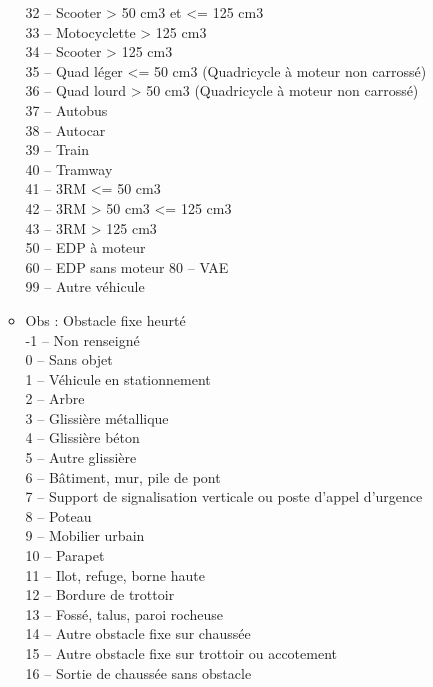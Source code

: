 \documentclass[french,]{tp}
\begin{document}
\begin{itemize}
\begin{itemize}
    32 -- Scooter \textgreater{} 50 cm3 et \textless= 125 cm3\\
    33 -- Motocyclette \textgreater{} 125 cm3\\
    34 -- Scooter \textgreater{} 125 cm3\\
    35 -- Quad léger \textless= 50 cm3 (Quadricycle à moteur non carrossé)\\
    36 -- Quad lourd \textgreater{} 50 cm3 (Quadricycle à moteur non carrossé)\\
    37 -- Autobus\\
    38 -- Autocar\\
    39 -- Train\\
    40 -- Tramway\\
    41 -- 3RM \textless= 50 cm3\\
    42 -- 3RM \textgreater{} 50 cm3 \textless= 125 cm3\\
    43 -- 3RM \textgreater{} 125 cm3\\
    50 -- EDP à moteur\\
    60 -- EDP sans moteur 80 -- VAE\\
    99 -- Autre véhicule
  \item
    Obs : Obstacle fixe heurté\\
    -1 -- Non renseigné\\
    0 -- Sans objet\\
    1 -- Véhicule en stationnement\\
    2 -- Arbre\\
    3 -- Glissière métallique\\
    4 -- Glissière béton\\
    5 -- Autre glissière\\
    6 -- Bâtiment, mur, pile de pont\\
    7 -- Support de signalisation verticale ou poste d'appel d'urgence\\
    8 -- Poteau\\
    9 -- Mobilier urbain\\
    10 -- Parapet\\
    11 -- Ilot, refuge, borne haute\\
    12 -- Bordure de trottoir\\
    13 -- Fossé, talus, paroi rocheuse\\
    14 -- Autre obstacle fixe sur chaussée\\
    15 -- Autre obstacle fixe sur trottoir ou accotement\\
    16 -- Sortie de chaussée sans obstacle\\

\end{itemize}
\end{itemize}
\end{document}
